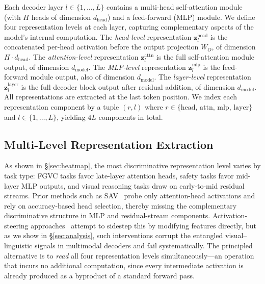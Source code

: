 \documentclass[sigconf,review,anonymous,9pt,table]{acmart}
\begin{document}
Each decoder layer $l \in \{1, \ldots, L\}$ contains a multi-head self-attention module (with $H$ heads of dimension $d_{\text{head}}$) and a feed-forward (MLP) module. We define four representation levels at each layer, capturing complementary aspects of the model's internal computation. The \emph{head-level} representation $\mathbf{z}^{\text{head}}_l$ is the concatenated per-head activation before the output projection $W_O$, of dimension $H \cdot d_{\text{head}}$. The \emph{attention-level} representation $\mathbf{z}^{\text{attn}}_l$ is the full self-attention module output, of dimension $d_{\text{model}}$. The \emph{MLP-level} representation $\mathbf{z}^{\text{mlp}}_l$ is the feed-forward module output, also of dimension $d_{\text{model}}$. The \emph{layer-level} representation $\mathbf{z}^{\text{layer}}_l$ is the full decoder block output after residual addition, of dimension $d_{\text{model}}$. All representations are extracted at the last token position. We index each representation component by a tuple $(r, l)$ where $r \in \{\text{head, attn, mlp, layer}\}$ and $l \in \{1, \ldots, L\}$, yielding $4L$ components in total.

\subsection{Multi-Level Representation Extraction}
\label{sec:extraction}

As shown in §\ref{sec:heatmap}, the most discriminative representation level varies by task type: FGVC tasks favor late-layer attention heads, safety tasks favor mid-layer MLP outputs, and visual reasoning tasks draw on early-to-mid residual streams.
Prior methods such as SAV~\cite{mitra2025enhancing} probe only attention-head activations and rely on accuracy-based head selection, thereby missing the complementary discriminative structure in MLP and residual-stream components.
Activation-steering approaches~\cite{li2025implicit,jiang2025mimic,ma2026and} attempt to sidestep this by modifying features directly, but as we show in §\ref{sec:analysis}, such interventions corrupt the entangled visual–linguistic signals in multimodal decoders and fail systematically.
The principled alternative is to \emph{read} all four representation levels simultaneously—an operation that incurs no additional computation, since every intermediate activation is already produced as a byproduct of a standard forward pass.
\end{document}
